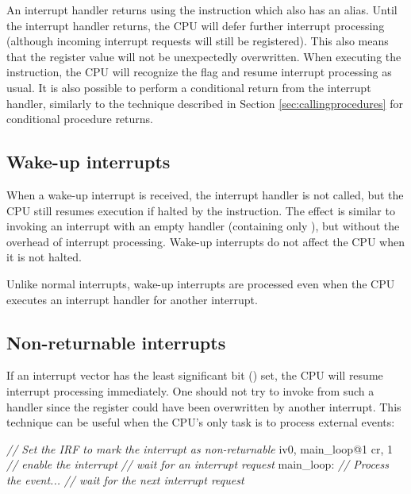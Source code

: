 \documentclass[a4paper,12pt,twoside,extrafontsizes]{memoir}
\begin{document}
An interrupt handler returns using the  instruction which also has an  alias. Until the interrupt handler returns, the CPU will defer further interrupt processing (although incoming interrupt requests will still be registered). This also means that the  register value will not be unexpectedly overwritten. When executing the  instruction, the CPU will recognize the  flag and resume interrupt processing as usual. It is also possible to perform a conditional return from the interrupt handler, similarly to the technique described in Section \ref{sec:callingprocedures} for conditional procedure returns.

\subsection{Wake-up interrupts}

When a wake-up interrupt is received, the interrupt handler is not called, but the CPU still resumes execution if halted by the  instruction. The effect is similar to invoking an interrupt with an empty handler (containing only ), but without the overhead of interrupt processing. Wake-up interrupts do not affect the CPU when it is not halted.

Unlike normal interrupts, wake-up interrupts are processed even when the CPU executes an interrupt handler for another interrupt.

\subsection{Non-returnable interrupts}

If an interrupt vector has the least significant bit () set, the CPU will resume interrupt processing immediately. One should not try to invoke  from such a handler since the  register could have been overwritten by another interrupt. This technique can be useful when the CPU's only task is to process external events:

\begin{codeparbreakable}
\emph{// Set the IRF to mark the interrupt as non-returnable}
     iv0, main\_loop@1
     cr, 1 \emph{// enable the interrupt}
     \emph{// wait for an interrupt request}
main\_loop:
\emph{// Process the event...}
     \emph{// wait for the next interrupt request}
\end{codeparbreakable}
\end{document}
